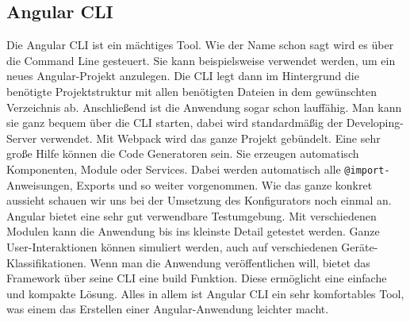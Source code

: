 \subsection{Angular CLI}
Die Angular CLI ist ein mächtiges Tool. Wie der Name schon sagt wird es über die Command Line gesteuert. Sie kann beispielsweise verwendet werden, um ein neues Angular-Projekt anzulegen. Die CLI legt dann im Hintergrund die benötigte Projektstruktur mit allen benötigten Dateien in dem gewünschten Verzeichnis ab. Anschließend ist die Anwendung sogar schon lauffähig. Man kann sie ganz bequem über die CLI starten, dabei wird standardmäßig der Developing-Server verwendet. Mit Webpack wird das ganze Projekt gebündelt. Eine sehr große Hilfe können die Code Generatoren sein. Sie erzeugen automatisch Komponenten, Module oder Services. Dabei werden automatisch alle \texttt{@import-}Anweisungen, Exports und so weiter vorgenommen. Wie das ganze konkret aussieht schauen wir uns bei der Umsetzung des Konfigurators noch einmal an. Angular bietet eine sehr gut verwendbare Testumgebung. Mit verschiedenen Modulen kann die Anwendung bis ins kleinste Detail getestet werden. Ganze User-Interaktionen können simuliert werden, auch auf verschiedenen Geräte-Klassifikationen. Wenn man die Anwendung veröffentlichen will, bietet das Framework über seine CLI eine build Funktion. Diese ermöglicht eine einfache und kompakte Lösung. Alles in allem ist Angular CLI ein sehr komfortables Tool, was einem das Erstellen einer Angular-Anwendung leichter macht.
%
